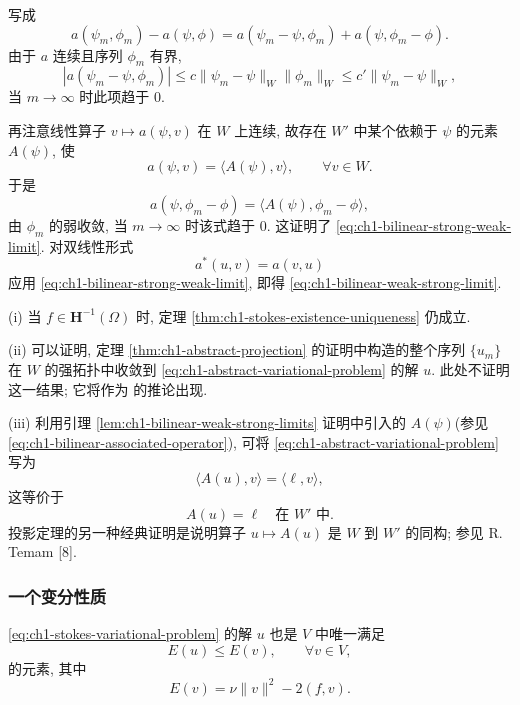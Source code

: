 \begin{Proof}
写成
\[
a(\psi_m,\phi_m)-a(\psi,\phi)
=a(\psi_m-\psi,\phi_m)+a(\psi,\phi_m-\phi).
\]
由于 $a$ 连续且序列 $\phi_m$ 有界,
\[
|a(\psi_m-\psi,\phi_m)|
\leq c\lVert\psi_m-\psi\rVert_W\lVert\phi_m\rVert_W
\leq c'\lVert\psi_m-\psi\rVert_W,
\]
当 $m\to\infty$ 时此项趋于 $0$.

再注意线性算子 $v\mapsto a(\psi,v)$ 在 $W$ 上连续, 故存在 $W'$ 中某个依赖于 $\psi$ 的元素 $A(\psi)$, 使
\begin{equation}
a(\psi,v)=\langle A(\psi),v\rangle,\qquad\forall v\in W.
\label{eq:ch1-bilinear-associated-operator}
\end{equation}
于是
\[
a(\psi,\phi_m-\phi)=\langle A(\psi),\phi_m-\phi\rangle,
\]
由 $\phi_m$ 的弱收敛, 当 $m\to\infty$ 时该式趋于 $0$. 这证明了 \eqref{eq:ch1-bilinear-strong-weak-limit}. 对双线性形式
\[
a^*(u,v)=a(v,u)
\]
应用 \eqref{eq:ch1-bilinear-strong-weak-limit}, 即得 \eqref{eq:ch1-bilinear-weak-strong-limit}.
\end{Proof}

\begin{Remark}
\label{rem:ch1-projection-theorem-comments}
(i) 当 $f\in\mathbf H^{-1}(\Omega)$ 时, 定理 \ref{thm:ch1-stokes-existence-uniqueness} 仍成立.

(ii) 可以证明, 定理 \ref{thm:ch1-abstract-projection} 的证明中构造的整个序列 $\{u_m\}$ 在 $W$ 的强拓扑中收敛到 \eqref{eq:ch1-abstract-variational-problem} 的解 $u$. 此处不证明这一结果; 它将作为  的推论出现.

(iii) 利用引理 \ref{lem:ch1-bilinear-weak-strong-limits} 证明中引入的 $A(\psi)$(参见 \eqref{eq:ch1-bilinear-associated-operator}), 可将 \eqref{eq:ch1-abstract-variational-problem} 写为
\[
\langle A(u),v\rangle=\langle\ell,v\rangle,
\]
这等价于
\begin{equation}
A(u)=\ell\quad\text{在 }W'\text{ 中}.
\label{eq:ch1-operator-equation}
\end{equation}
投影定理的另一种经典证明是说明算子 $u\mapsto A(u)$ 是 $W$ 到 $W'$ 的同构; 参见 R. Temam [8].
\end{Remark}

\subsubsection*{一个变分性质}

\begin{Proposition}
\label{prop:ch1-stokes-energy-minimizer}
\eqref{eq:ch1-stokes-variational-problem} 的解 $u$ 也是 $V$ 中唯一满足
\begin{equation}
E(u)\leq E(v),\qquad\forall v\in V,
\label{eq:ch1-stokes-energy-minimum}
\end{equation}
的元素, 其中
\begin{equation}
E(v)=\nu\lVert v\rVert^2-2(f,v).
\label{eq:ch1-stokes-energy-functional}
\end{equation}
\end{Proposition}

